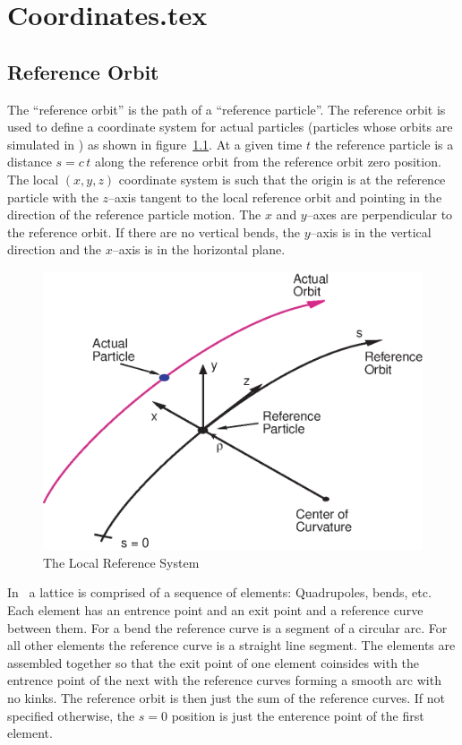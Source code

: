\chapter{Coordinates.tex}

\section{Reference Orbit}
\label{sec:ref}

The ``reference orbit'' is the path of a ``reference particle''.  The
reference orbit is used to define a coordinate system for actual
particles (particles whose orbits are simulated in \bmad) as shown in
figure~\ref{f:local_coords}. At a given time $t$ the reference
particle is a distance $s = c \, t$ along the reference orbit from the
reference orbit zero position. The local $(x, y, z)$ coordinate system
is such that the origin is at the reference particle with the
$z$--axis tangent to the local reference orbit and pointing in the
direction of the reference particle motion. The $x$ and $y$--axes are
perpendicular to the reference orbit. If there are no vertical bends,
the $y$--axis is in the vertical direction and the $x$--axis is in the
horizontal plane.

\begin{figure}[tb]
\centering
\includegraphics{local_coords.ps}
\caption{The Local Reference System}
\label{f:local_coords}
\end{figure}

In \bmad\ a lattice is comprised of a sequence of elements:
Quadrupoles, bends, etc. Each element has an entrence point and an
exit point and a reference curve between them. For a bend the
reference curve is a segment of a circular arc. For all other elements
the reference curve is a straight line segment. The elements are assembled
together so that the exit point of one element coinsides with the
entrence point of the next with the reference curves forming a smooth
arc with no kinks. The reference orbit is then just the sum of the
reference curves. If not specified otherwise, the $s = 0$ position is
just the enterence point of the first element.

